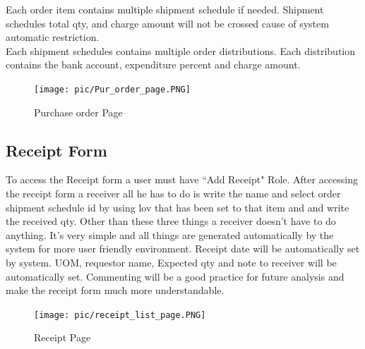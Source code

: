 \documentclass[12pt]{report} %
\begin{document}
Each order item contains multiple shipment schedule if needed. Shipment schedules total qty, and charge amount will not be crossed cause of system automatic restriction. \\

Each shipment schedules contains multiple order distributions. Each distribution contains the bank account, expenditure percent and charge amount.
\clearpage



\begin{landscape}
\begin{figure}[h]
	\begin{center}
	\texttt{[image: pic/Pur\_order\_page.PNG]}
	\end{center}
	\caption{Purchase order Page}
	\label{fig:Pur_order_page}
\end{figure}
\thispagestyle{empty} 
\end{landscape}
\clearpage





\begin{landscape}
\section{Receipt Form}
To access the Receipt form a user must have ``Add Receipt" Role. After accessing the receipt form a receiver all he has to do is write the name and select order shipment schedule id by using lov that has been set to that item and and write the received qty. Other than these three things a receiver doesn't have to do anything. It's very simple and all things are generated automatically by the system for more user friendly environment. Receipt date will be automatically set by system. UOM, requestor name, Expected qty and note to receiver will be automatically set. Commenting will be a good practice for future analysis and make the receipt form much more understandable.
\begin{figure}[h]
	\begin{center}
	\texttt{[image: pic/receipt\_list\_page.PNG]}
	\end{center}
	\caption{Receipt Page}
	\label{fig:receipt_list_page}
\end{figure}
\thispagestyle{empty} 
\end{landscape}
\clearpage



\restoregeometry
\end{document}
